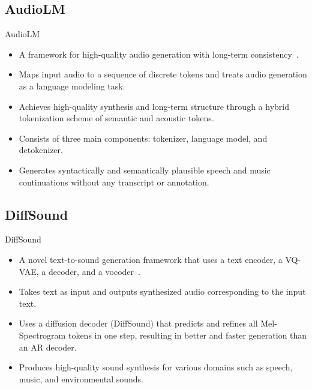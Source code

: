 \subsection{AudioLM}
\begin{frame}{AudioLM}
    \begin{itemize}
        \item A framework for high-quality audio generation with long-term consistency~\cite{borsos_audiolm_2022}.
        \item Maps input audio to a sequence of discrete tokens and treats audio generation as a language modeling task.
        \item Achieves high-quality synthesis and long-term structure through a hybrid tokenization scheme of semantic and acoustic tokens.
        \item Consists of three main components: tokenizer, language model, and detokenizer.
        \item Generates syntactically and semantically plausible speech and music continuations without any transcript or annotation.
    \end{itemize}
\end{frame}

\subsection{DiffSound}

\begin{frame}{DiffSound}
    \begin{itemize}
        \item A novel text-to-sound generation framework that uses a text encoder, a VQ-VAE, a decoder, and a vocoder~\cite{yang_diffsound_2022}.
        \item Takes text as input and outputs synthesized audio corresponding to the input text.
        \item Uses a diffusion decoder (DiffSound) that predicts and refines all Mel-Spectrogram tokens in one step, resulting in better and faster generation than an AR decoder.
        \item Produces high-quality sound synthesis for various domains such as speech, music, and environmental sounds.
    \end{itemize}
\end{frame}


